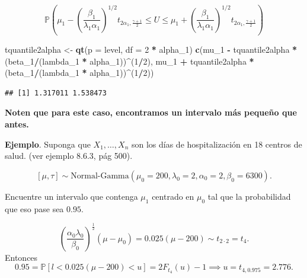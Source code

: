 \documentclass[
  12pt,
]{book}
\newenvironment{Shaded}{\begin{snugshade}}{\end{snugshade}}
\newcommand{\DataTypeTok}[1]{\textcolor[rgb]{0.13,0.29,0.53}{#1}}
\newcommand{\DecValTok}[1]{\textcolor[rgb]{0.00,0.00,0.81}{#1}}
\newcommand{\KeywordTok}[1]{\textcolor[rgb]{0.13,0.29,0.53}{\textbf{#1}}}
\newcommand{\NormalTok}[1]{#1}
\newcommand{\OperatorTok}[1]{\textcolor[rgb]{0.81,0.36,0.00}{\textbf{#1}}}
\newcommand{\StringTok}[1]{\textcolor[rgb]{0.31,0.60,0.02}{#1}}
\begin{document}
\begin{equation*}
\mathbb P \left(\mu_1 - \left(\dfrac{\beta_1}{\lambda_1\alpha_1}\right)^{1/2}
t_{2\alpha_1, \tfrac{\gamma+1}{2}} 
\leq U 
\leq \mu_1 + \left(\dfrac{\beta_1}{\lambda_1\alpha_1}\right)^{1/2} t_{2\alpha_1, \tfrac{\gamma+1}{2}}\right)
\end{equation*}

\begin{Shaded}
\begin{Highlighting}[]
\NormalTok{tquantile2alpha \textless{}{-}}\StringTok{ }\KeywordTok{qt}\NormalTok{(}\DataTypeTok{p =}\NormalTok{ level, }\DataTypeTok{df =} \DecValTok{2} \OperatorTok{*}\StringTok{ }\NormalTok{alpha\_}\DecValTok{1}\NormalTok{)}
\KeywordTok{c}\NormalTok{(mu\_}\DecValTok{1} \OperatorTok{{-}}\StringTok{ }\NormalTok{tquantile2alpha }\OperatorTok{*}\StringTok{ }\NormalTok{(beta\_}\DecValTok{1}\OperatorTok{/}\NormalTok{(lambda\_}\DecValTok{1} \OperatorTok{*}\StringTok{ }\NormalTok{alpha\_}\DecValTok{1}\NormalTok{))}\OperatorTok{\^{}}\NormalTok{(}\DecValTok{1}\OperatorTok{/}\DecValTok{2}\NormalTok{), }
\NormalTok{    mu\_}\DecValTok{1} \OperatorTok{+}\StringTok{ }\NormalTok{tquantile2alpha }\OperatorTok{*}\StringTok{ }\NormalTok{(beta\_}\DecValTok{1}\OperatorTok{/}\NormalTok{(lambda\_}\DecValTok{1} \OperatorTok{*}\StringTok{ }\NormalTok{alpha\_}\DecValTok{1}\NormalTok{))}\OperatorTok{\^{}}\NormalTok{(}\DecValTok{1}\OperatorTok{/}\DecValTok{2}\NormalTok{))}
\end{Highlighting}
\end{Shaded}

\begin{verbatim}
## [1] 1.317011 1.538473
\end{verbatim}

\textbf{Noten que para este caso, encontramos un intervalo más pequeño que antes. }

\textbf{Ejemplo}. Suponga que \(X_1,\dots,X_{n}\) son los días de hospitalización en 18 centros de salud. (ver ejemplo 8.6.3, pág 500).

\[[\mu,\tau]\sim \text{Normal-Gamma}(\mu_0=200,\lambda_0=2,\alpha_0=2,\beta_0=6300).\]

Encuentre un intervalo que contenga \(\mu_1\) centrado en \(\mu_0\) tal que la probabilidad que eso pase sea \(0.95\).

\[\left(\dfrac{\alpha_0\lambda_0}{\beta_0}\right)^{\frac 12}(\mu-\mu_0) = 0.025(\mu - 200)\sim t_{2\cdot2} = t_4.\]
Entonces
\[0.95 = \mathbb P[l<0.025(\mu-200)<u] = 2F_{t_4}(u)-1 \implies u = t_{4,0.975} = 2.776.\]
\end{document}
